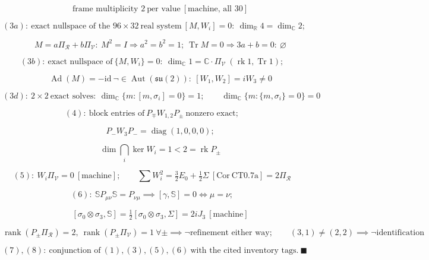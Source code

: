 \begin{theorem}
\[
\qquad \text{frame multiplicity }2\ \text{per value}\ [\text{machine, all }30]
\]

\[
(3a):\ \text{exact nullspace of the }96\times32\ \text{real system}\ [M,W_i]=0:\ \dim_{\mathbb R}4=\dim_{\mathbb C}2;
\]

\[
\qquad M=a\Pi_{\mathcal R}+b\Pi_{\mathcal V}:\ M^2=I\Rightarrow a^2=b^2=1;\ \operatorname{Tr}M=0\Rightarrow3a+b=0:\ \varnothing
\]

\[
(3b):\ \text{exact nullspace of}\ \{M,W_i\}=0:\ \dim_{\mathbb C}1=\mathbb C\cdot\Pi_{\mathcal V}\ (\operatorname{rk}1,\operatorname{Tr}1);
\]

\[
\qquad \operatorname{Ad}(M)=-\mathrm{id}\ \neg\in\operatorname{Aut}(\mathfrak{su}(2)):\ [W_1,W_2]=iW_3\ne0
\]

\[
(3d):\ 2\times2\ \text{exact solves}:\ \dim_{\mathbb C}\{m:[m,\sigma_i]=0\}=1;\qquad\dim_{\mathbb C}\{m:\{m,\sigma_i\}=0\}=0
\]

\[
(4):\ \text{block entries of}\ P_\mp W_{1,2}P_\pm\ \text{nonzero exact};
\]

\[
\qquad P_-W_3P_-=\operatorname{diag}(1,0,0,0);
\]

\[
\qquad \dim\bigcap_i\ker W_i=1<2=\operatorname{rk}P_\pm
\]

\[
(5):\ W_i\Pi_{\mathcal V}=0\ [\text{machine}];\qquad\sum W_i^2=\tfrac32E_0+\tfrac12\Sigma\ [\mathrm{Cor\ CT0.7a}]=2\Pi_{\mathcal R}
\]

\[
(6):\ \mathbb S P_{\mu\nu}\mathbb S=P_{\nu\mu}\implies[\gamma,\mathbb S]=0\iff\mu=\nu;
\]

\[
\qquad [\sigma_0\otimes\sigma_3,\mathbb S]=\tfrac12[\sigma_0\otimes\sigma_3,\Sigma]=2iJ_3\ [\text{machine}]
\]

\[
\operatorname{rank}(P_\pm\Pi_{\mathcal R})=2,\ \operatorname{rank}(P_\pm\Pi_{\mathcal V})=1\ \forall\pm\implies\neg\text{refinement either way};\qquad(3,1)\ne(2,2)\implies\neg\text{identification}
\]

\[
(7),(8):\ \text{conjunction of}\ (1),(3),(5),(6)\ \text{with the cited inventory tags.}\ \blacksquare
\]


\end{theorem}
